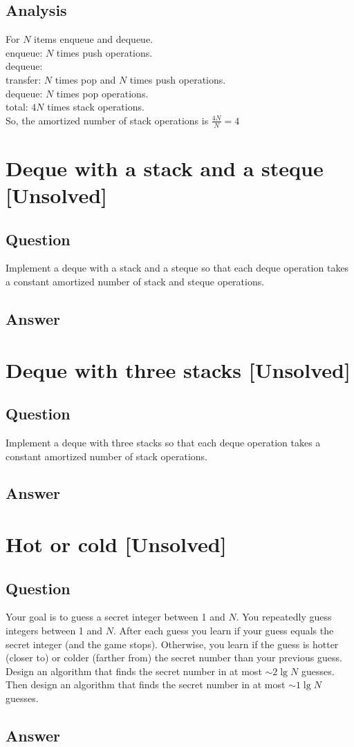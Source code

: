 \documentclass[12pt]{article}
\numberwithin{equation}{section}
\begin{document}
\subsection*{Analysis}
For $N$ items enqueue and dequeue.\\
enqueue: $N$ times push operations.\\
dequeue:\\
\indent transfer: $N$ times pop and $N$ times push  operations.\\
\indent dequeue: $N$ times pop operations.\\
total: $4N$ times stack operations.\\
So, the amortized number of stack operations is $\frac{4N}{N}=4$

\newpage
\section{Deque with a stack and a steque [Unsolved]}
\subsection*{Question}
Implement a deque with a stack and a steque
so that each deque operation takes a constant amortized number
of stack and steque operations.
\subsection*{Answer}

\newpage
\section{Deque with three stacks [Unsolved]}
\subsection*{Question}
Implement a deque with three stacks so that each
deque operation takes a constant amortized number of stack operations.
\subsection*{Answer}

\newpage
\section{Hot or cold [Unsolved]}
\subsection*{Question}
Your goal is to guess a secret integer between 1 and $N$. You repeatedly 
guess integers between 1 and $N$. After each guess you learn if your guess equals the
secret integer (and the game stops). Otherwise, you learn if the guess is hotter (closer to)
or colder (farther from) the secret number than your previous guess. Design an algorithm
that finds the secret number in at most $\sim$$2\lg{N}$ guesses. Then design an algorithm
that finds the secret number in at most $\sim$$1\lg{N}$ guesses.
\subsection*{Answer}
\end{document}
